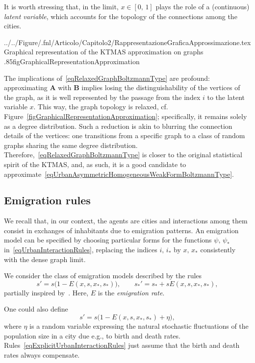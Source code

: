 \documentclass[a4paper]{article}
\begin{document}
It is worth stressing that, in the limit, $x\in [0,\,1]$ plays the role of a (continuous) \textit{latent variable}, which accounts for the topology of the connections among the cities.

  {../../Figure/.fnl/Articolo/Capitolo2/RappresentazioneGraficaApprossimazione.tex}
  {Graphical representation of the KTMAS approximation on graphs}
  {.85\linewidth}{figGraphicalRepresentationApproximation}

The implications of~\eqref{eqRelaxedGraphBoltzmannType} are profound: approximating $\mathbf A$ with $\mathbf B$ implies losing the distinguishability of the vertices of the graph, as it is well represented by the passage from the index $i$ to the latent variable $x$. This way, the graph topology is relaxed, cf. Figure~\ref{figGraphicalRepresentationApproximation}; specifically, it remains solely as a degree distribution. Such a reduction is akin to blurring the connection details of the vertices: one transitions from a specific graph to a class of random graphs sharing the same degree distribution. Therefore,~\eqref{eqRelaxedGraphBoltzmannType} is closer to the original statistical spirit of the KTMAS, and, as such, it is a good candidate to approximate~\eqref{eqUrbanAsymmetricHomogeneousWeakFormBoltzmannType}.

\subsection{Emigration rules}
\label{secEmigrationRules}
%
We recall that, in our context, the agents are cities and interactions among them consist in exchanges of inhabitants due to emigration patterns. An emigration model can be specified by choosing particular forms for the functions $\psi,\,\psi_\ast$ in~\eqref{eqUrbanInteractionRules}, replacing the indices $i,\,i_\ast$ by $x,\,x_\ast$ consistently with the dense graph limit.

We consider the class of emigration models described by the rules
\begin{equation}
    s'=s\bigl(1-E(x,s,x_\ast,s_\ast)\bigr), \qquad s_\ast'=s_\ast+sE(x,s,x_\ast,s_\ast),
    \label{eqExplicitUrbanInteractionRules}
\end{equation}
partially inspired by~\cite{Gualandi2019SDC}. Here, $E$ is the \textit{emigration rate}.
            
\begin{rmk}
One could also define
$$ s'=s\bigl(1-E(x,s,x_\ast,s_\ast)+\eta\bigr), $$
where $\eta$ is a random variable expressing the natural stochastic fluctuations of the population size in a city due e.g., to birth and death rates. Rules~\eqref{eqExplicitUrbanInteractionRules} just assume that the birth and death rates always compensate.
\end{rmk}
            
\end{document}
